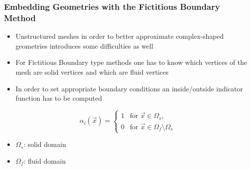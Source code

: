 \begin{frame}
\frametitle{Embedding Geometries with the Fictitious Boundary Method}
\begin{itemize}
\item Unstructured meshes in order to better approximate complex-shaped geometries introduces some difficulties as well
\item For Fictitious Boundary type methods one has to know which vertices of the mesh are solid vertices and which are fluid vertices
\item In order to set appropriate boundary conditions an inside/outside indicator function has to be computed
\end{itemize}
\begin{equation*}
 \alpha_{i} (\vec{x}) = 
   \begin{cases}1  &  \mbox{for } \vec{x} \in \Omega_{s}, \\
                0  &  \mbox{for } \vec{x} \in \Omega_{f} \setminus \Omega_s  
   \end{cases}   
\end{equation*}
\begin{itemize}
\item $\Omega_{s}$: solid domain
\item $\Omega_{f}$: fluid domain
\end{itemize}
\end{frame}


